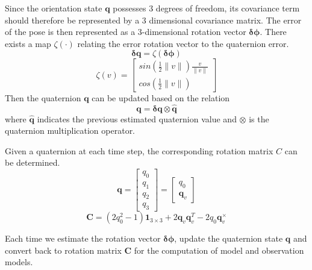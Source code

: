 \documentclass[letterpaper, 10 pt, conference]{ieeeconf}  %
\begin{document}
Since the orientation state $\bm{q}$ possesses 3 degrees of freedom, its covariance term should therefore be represented by a 3 dimensional covariance matrix. The error of the pose is then represented as a 3-dimensional rotation vector $\bm{\delta \phi}$. There exists a map $\zeta(\cdot)$ relating the error rotation vector to the quaternion error.
\begin{equation}
\bm{\delta q} = \zeta(\bm{\delta \phi})
\end{equation}
\begin{equation}
\renewcommand\arraystretch{1.7}
 \zeta(v)=\begin{bmatrix}
  sin\left(\frac{1}{2}\|v\|\right)\frac{v}{\|v\|}  \\
  cos\left(\frac{1}{2}\|v\|\right)
 \end{bmatrix}
\end{equation} 
Then the quaternion $\bm{q}$ can be updated based on the relation
\begin{equation}
\bm{q}=\bm{\delta q}\otimes \bm{\hat{q}}
\end{equation}
where $\bm{\hat{q}}$ indicates the previous estimated quaternion value and $\otimes$ is the quaternion multiplication operator.
 
Given a quaternion at each time step, the corresponding rotation matrix $C$ can be determined.
\begin{equation}
\bm{q} =\begin{bmatrix}
q_0  \\
q_1  \\
q_2  \\
q_3  
\end{bmatrix}=\begin{bmatrix}
q_0  \\
\bm{q}_v
\end{bmatrix}   
\end{equation}
\begin{equation}
\bm{C} = (2q_0^2-1)\bm{1}_{3\times3}+2\bm{q}_v\bm{q}_v^T-2q_0\bm{q}_v^{\times}
\end{equation}

Each time we estimate the rotation vector $\bm{\delta \phi}$, update the quaternion state $\bm{q}$ and convert back to rotation matrix $\bm{C}$ for the computation of model and observation models.    
\end{document}
